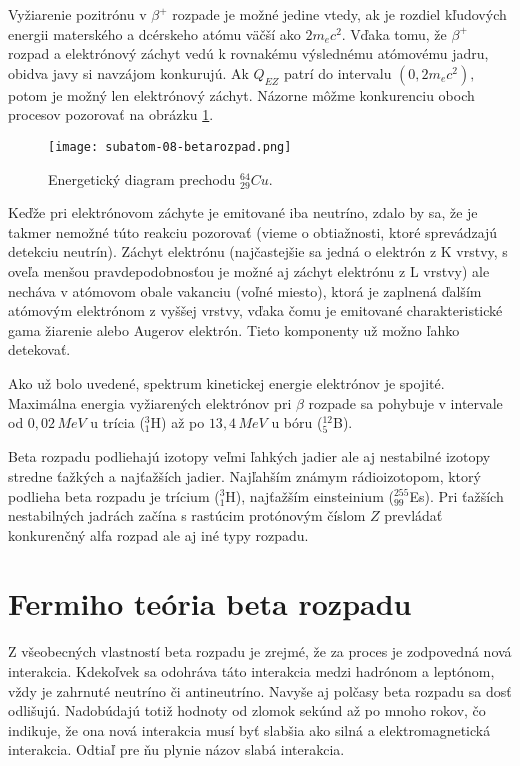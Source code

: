 \documentclass[../../main.tex]{subfiles}
\begin{document}
Vyžiarenie pozitrónu v $\beta^+$ rozpade je možné jedine vtedy, ak je rozdiel kľudových energii materského a dcérskeho atómu väčší ako $2m_ec^2$. Vďaka tomu, že $\beta^+$ rozpad a elektrónový záchyt vedú k rovnakému výslednému atómovému jadru, obidva javy si navzájom konkurujú. Ak  $Q_{EZ} $ patrí do intervalu $(0,2m_ec^2),$ potom je možný len elektrónový záchyt. Názorne môžme konkurenciu oboch procesov pozorovať na obrázku \ref{sf8:fig:betarozpad}.

\begin{figure}[!h]
\texttt{[image: subatom-08-betarozpad.png]}
\centering
\caption{Energetický diagram prechodu $^{64}_{29}Cu$.}
\label{sf8:fig:betarozpad}
\end{figure}

Keďže pri elektrónovom záchyte je emitované iba neutríno, zdalo by sa, že je takmer nemožné túto reakciu pozorovať (vieme o obtiažnosti, ktoré sprevádzajú detekciu neutrín). Záchyt elektrónu (najčastejšie sa jedná o elektrón z K vrstvy, s oveľa menšou pravdepodobnosťou je možné aj záchyt elektrónu z L vrstvy) ale necháva v atómovom obale vakanciu (voľné miesto), ktorá je zaplnená ďalším atómovým elektrónom z vyššej vrstvy, vďaka čomu je emitované charakteristické gama žiarenie alebo Augerov elektrón. Tieto komponenty už možno ľahko detekovať.

Ako už bolo uvedené, spektrum kinetickej energie elektrónov je spojité. Maximálna energia vyžiarených elektrónov pri $\beta$ rozpade sa pohybuje v intervale od $0,02\,\unit{MeV}$ u trícia ($^3_1$H) až po $13,4\,\unit{MeV}$ u bóru ($^{12}_{5}$B).

Beta rozpadu podliehajú izotopy veľmi ľahkých jadier ale aj nestabilné izotopy stredne ťažkých a najťažších jadier. Najľahším známym rádioizotopom, ktorý podlieha beta rozpadu je trícium ($^3_1$H), najťažším einsteinium ($^{255}_{99}$Es). Pri ťažších nestabilných jadrách začína s rastúcim protónovým číslom $Z$ prevládať konkurenčný alfa rozpad ale aj iné typy rozpadu.

\section{Fermiho teória beta rozpadu}
Z všeobecných vlastností beta rozpadu je zrejmé, že za proces je zodpovedná nová interakcia. Kdekoľvek sa odohráva táto interakcia medzi hadrónom a leptónom, vždy je zahrnuté neutríno či antineutríno. Navyše aj polčasy beta rozpadu sa dosť odlišujú. Nadobúdajú totiž hodnoty od zlomok sekúnd až po mnoho rokov, čo indikuje, že ona nová interakcia musí byť slabšia ako silná a elektromagnetická interakcia. Odtiaľ pre ňu plynie názov slabá interakcia.
\end{document}
